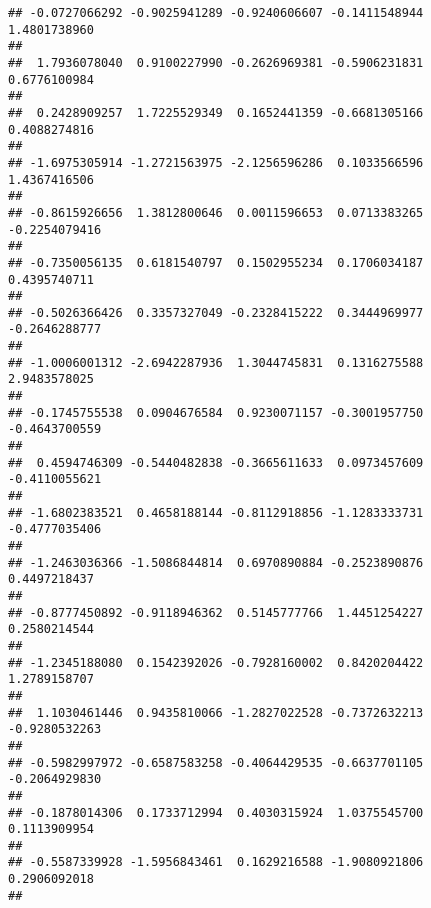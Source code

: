 \documentclass[]{article}
\begin{document}
\begin{verbatim}
## -0.0727066292 -0.9025941289 -0.9240606607 -0.1411548944  1.4801738960 
##                                                                       
##  1.7936078040  0.9100227990 -0.2626969381 -0.5906231831  0.6776100984 
##                                                                       
##  0.2428909257  1.7225529349  0.1652441359 -0.6681305166  0.4088274816 
##                                                                       
## -1.6975305914 -1.2721563975 -2.1256596286  0.1033566596  1.4367416506 
##                                                                       
## -0.8615926656  1.3812800646  0.0011596653  0.0713383265 -0.2254079416 
##                                                                       
## -0.7350056135  0.6181540797  0.1502955234  0.1706034187  0.4395740711 
##                                                                       
## -0.5026366426  0.3357327049 -0.2328415222  0.3444969977 -0.2646288777 
##                                                                       
## -1.0006001312 -2.6942287936  1.3044745831  0.1316275588  2.9483578025 
##                                                                       
## -0.1745755538  0.0904676584  0.9230071157 -0.3001957750 -0.4643700559 
##                                                                       
##  0.4594746309 -0.5440482838 -0.3665611633  0.0973457609 -0.4110055621 
##                                                                       
## -1.6802383521  0.4658188144 -0.8112918856 -1.1283333731 -0.4777035406 
##                                                                       
## -1.2463036366 -1.5086844814  0.6970890884 -0.2523890876  0.4497218437 
##                                                                       
## -0.8777450892 -0.9118946362  0.5145777766  1.4451254227  0.2580214544 
##                                                                       
## -1.2345188080  0.1542392026 -0.7928160002  0.8420204422  1.2789158707 
##                                                                       
##  1.1030461446  0.9435810066 -1.2827022528 -0.7372632213 -0.9280532263 
##                                                                       
## -0.5982997972 -0.6587583258 -0.4064429535 -0.6637701105 -0.2064929830 
##                                                                       
## -0.1878014306  0.1733712994  0.4030315924  1.0375545700  0.1113909954 
##                                                                       
## -0.5587339928 -1.5956843461  0.1629216588 -1.9080921806  0.2906092018 
##                                                                       

\end{verbatim}
\end{document}
